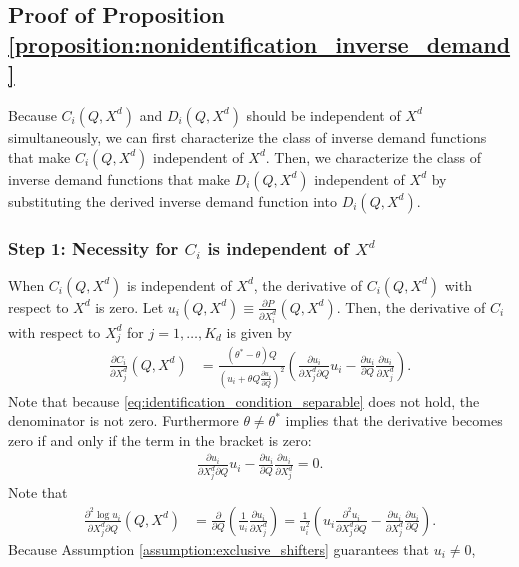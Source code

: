 \documentclass[11pt, a4paper]{article}
\theoremstyle{remark}
\begin{document}
\subsection{Proof of Proposition \ref{proposition:nonidentification_inverse_demand}}


Because $C_i(Q, X^{d})$ and $D_i(Q, X^{d})$ should be independent of $X^{d}$ simultaneously, we can first characterize the class of inverse demand functions that make $C_i(Q, X^{d})$ independent of $X^{d}$.
Then, we characterize the class of inverse demand functions that make $D_i(Q, X^{d})$ independent of $X^{d}$ by substituting the derived inverse demand function into $D_i(Q, X^{d})$.

\subsubsection*{Step 1: Necessity for $C_i$ is independent of $X^{d}$}
When $C_i(Q, X^{d})$ is independent of $X^{d}$, the derivative of $C_i(Q, X^{d})$ with respect to $X^{d}$ is zero.
Let $u_i(Q, X^{d}) \equiv \frac{\partial P}{\partial X^{d}_i}(Q, X^{d})$.
Then, the derivative of $C_i$ with respect to $X^{d}_j$ for $j = 1, \ldots, K_d$ is given by
\begin{align}
    \frac{\partial C_i}{\partial X^{d}_j}(Q, X^{d}) & = \frac{(\theta^{*} - \theta)Q }{\left(u_i + \theta Q \frac{\partial u_i}{\partial Q}\right)^2}\left(\frac{\partial u_i}{\partial X^{d}_j\partial Q} u_i - \frac{\partial u_i}{\partial Q} \frac{\partial u_i}{\partial X^{d}_j}\right).
\end{align}
Note that because \eqref{eq:identification_condition_separable} does not hold, the denominator is not zero.
Furthermore $\theta \ne \theta^{*}$ implies that the derivative becomes zero if and only if the term in the bracket is zero:
\begin{align}
    \frac{\partial u_i}{\partial X^{d}_j\partial Q} u_i - \frac{\partial u_i}{\partial Q} \frac{\partial u_i}{\partial X^{d}_j} = 0. \label{eq:identification_condition_separable_step1}
\end{align}
Note that 
\begin{align}
    \frac{\partial^2 \log u_i}{\partial X^{d}_j \partial Q}(Q, X^{d}) & = \frac{\partial }{\partial Q}\left(\frac{1}{u_i}\frac{\partial u_i}{\partial X^{d}_j}\right) = \frac{1}{u_i^2}\left(u_i\frac{\partial^2 u_i}{\partial X^{d}_j \partial Q} - \frac{\partial u_i}{\partial X^{d}_j}\frac{\partial u_i}{\partial Q}\right).
\end{align}
Because Assumption \ref{assumption:exclusive_shifters} guarantees that $u_i \ne 0$, 
\end{document}
